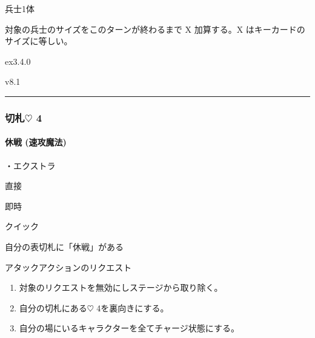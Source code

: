 \documentclass[letterpaper,10pt,dvipdfmx]{sphinxmanual}
\begin{document}
\sphinxAtStartPar
兵士1体

\sphinxAtStartPar
{}

\sphinxAtStartPar
対象の兵士のサイズをこのターンが終わるまで X 加算する。X はキーカードのサイズに等しい。

\sphinxAtStartPar
{}  ex3.4.0

\sphinxAtStartPar
{}  v8.1


\bigskip\hrule\bigskip



\subsubsection{切札{\normalsize $\heartsuit$} 4}
\label{\detokenize{auto/frameActionlist:id35}}

\paragraph{休戦 (速攻魔法)}
\label{\detokenize{auto/frameActionlist:act-retreat}}\label{\detokenize{auto/frameActionlist:id36}}
\sphinxAtStartPar
{}

\sphinxAtStartPar
・エクストラ

\sphinxAtStartPar
{} 直接

\sphinxAtStartPar
{} 即時

\sphinxAtStartPar
{} クイック

\sphinxAtStartPar
{}

\sphinxAtStartPar
自分の表切札に「休戦」がある

\sphinxAtStartPar
{}

\sphinxAtStartPar
アタックアクションのリクエスト

\sphinxAtStartPar
{}
\begin{enumerate}
%
\item {} 
\sphinxAtStartPar
対象のリクエストを無効にしステージから取り除く。

\item {} 
\sphinxAtStartPar
自分の切札にある{\normalsize $\heartsuit$} 4を裏向きにする。

\item {} 
\sphinxAtStartPar
自分の場にいるキャラクターを全てチャージ状態にする。

\end{enumerate}
\end{document}
